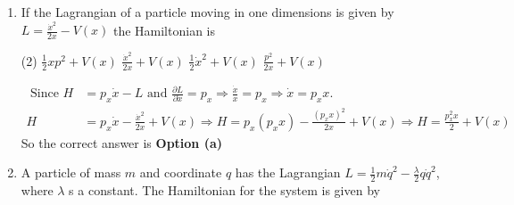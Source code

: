 \begin{enumerate}
	 \begin{tasks}(4)
		\task[\textbf{a.}]$x \ddot{x}-y \ddot{y}$
		\task[\textbf{b.}]$x \ddot{y}-y \ddot{x}$
		\task[\textbf{c.}]$x \dot{y}-y \dot{x}$
		\task[\textbf{d.}] $y \dot{x}^{2}+x \dot{y}^{2}$
	\end{tasks}
	\begin{answer}
		$$
		\begin{aligned}
		&L(x, y, \dot{x}, \dot{y})\\
		&L^{\prime}=L(x, y, \dot{x}, \dot{y})+x \ddot{y}-y \ddot{x}\\
		&\frac{d^{\prime}}{d t^{\prime}}\left(\frac{\partial L^{\prime}}{\partial \dot{x}}\right)-\frac{\partial L^{\prime}}{\partial x}=\frac{d}{d t}\left(\frac{\partial L}{\partial \dot{x}}\right)-\frac{\partial L}{\partial x}+\ddot{y}=0=0+\ddot{y}=0 \\ \dot{y}&=c_{1}\\
		&\frac{d}{d t}\left(\frac{\partial L}{\partial y}\right)-\frac{\partial L^{\prime}}{\partial y}=\frac{d}{d t}\left(\frac{\partial L}{\partial \dot{y}}\right)-\frac{\partial L}{\partial y}+\ddot{x}=0=0-\ddot{x}=0 \\ \dot{x}&=c_{2}
	\end{aligned}
	$$
	So the correct answer is \textbf{Option (b)}
	\end{answer}
\item If the Lagrangian of a particle moving in one dimensions is given by $L=\frac{\dot{x}^{2}}{2 x}-V(x)$ the Hamiltonian is

 \begin{tasks}(2)
	\task[\textbf{a.}]$\frac{1}{2} x p^{2}+V(x)$
	\task[\textbf{b.}] $\frac{\dot{x}^{2}}{2 x}+V(x)$
	\task[\textbf{c.}]$\frac{1}{2} \dot{x}^{2}+V(x)$
	\task[\textbf{d.}] $\frac{p^{2}}{2 x}+V(x)$
\end{tasks}
\begin{answer}
	$$
	\begin{aligned}
	\text { Since } H&=p_{x} \dot{x}-L \text { and } \frac{\partial L}{\partial \dot{x}}=p_{x} \Rightarrow \frac{\dot{x}}{x}=p_{x} \Rightarrow \dot{x}=p_{x} x \text {. }\\
	H&=p_{x} \dot{x}-\frac{\dot{x}^{2}}{2 x}+V(x) \Rightarrow H=p_{x}\left(p_{x} x\right)-\frac{\left(p_{x} x\right)^{2}}{2 x}+V(x) \Rightarrow H=\frac{p_{x}^{2} x}{2}+V(x)
\end{aligned}
$$
	So the correct answer is \textbf{Option (a)}
\end{answer}
\item A particle of mass $m$ and coordinate $q$ has the Lagrangian $L=\frac{1}{2} m \dot{q}^{2}-\frac{\lambda}{2} q \dot{q}^{2}$, where $\lambda$ s a constant. The Hamiltonian for the system is given by 


\end{enumerate}
